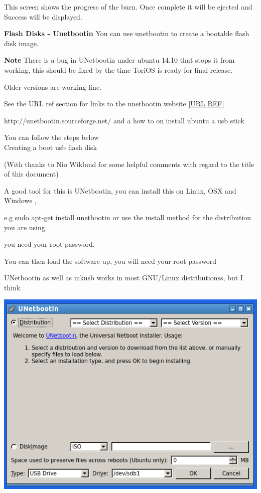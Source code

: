 \documentclass[12pt,a4paper]{book}
\begin{document}
This screen shows the progress of the burn.  Once complete it will be ejected and Success will be displayed. 

\newpage

\textbf{Flash Disks - Unetbootin}
You can use unetbootin to create a bootable flash disk image.   

\textbf{Note} There is a bug in UNetbootin under ubuntu 14.10 that stops it from working,  this should be fixed by the time ToriOS is ready for final release. 

Older versions are working fine.

See the URL ref section for links to the unetbootin website \ref{URL REF}

http://unetbootin.sourceforge.net/ \cite{unetbootin} and a how to on install ubuntu a usb stick \cite{unetbootin2}

You can follow the steps below \\

Creating a boot usb flash disk

(With thanks to Nio Wiklund for some helpful comments with regard to the title of this document)

A good tool for this is UNetbootin, \cite{unetbootin}  you can install this on Linux, OSX and Windows ,

e.g sudo apt-get install unetbootin or use the install method for the distribution you are using. 

you need your root password.

You can then load the software up, you will need your root password

UNetbootin as well as mkusb works in most GNU/Linux distributionss, but I think

\newpage




\begin{center}
\includegraphics[width=0.7\linewidth]{screen-shots/unetbootin} 
\end{center}
\end{document}
